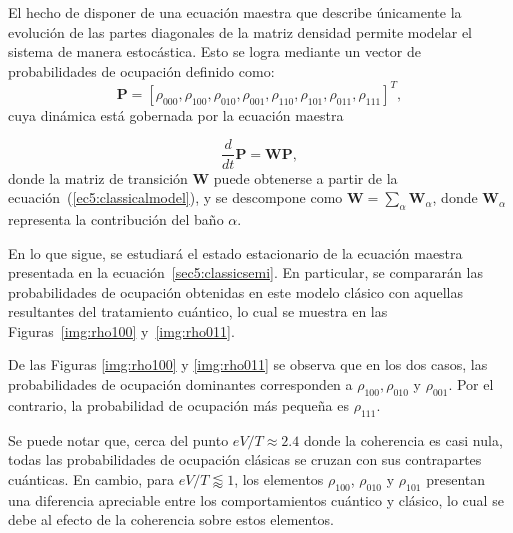 El hecho de disponer de una ecuación maestra que describe únicamente la evolución de las partes diagonales de la matriz densidad permite modelar el sistema de manera estocástica. Esto se logra mediante un vector de probabilidades de ocupación definido como:
\begin{equation*}
\mathbf{P} = [\rho_{000}, \rho_{100}, \rho_{010}, \rho_{001}, \rho_{110}, \rho_{101}, \rho_{011}, \rho_{111}]^{T},
\end{equation*}
cuya dinámica está gobernada por la ecuación maestra

\begin{equation}
    \frac{d}{dt}\textbf{P} = \textbf{W}\textbf{P},
    \label{sec5:classicsemi}
\end{equation}
donde la matriz de transición $\mathbf{W}$ puede obtenerse a partir de la ecuación~(\ref{ec5:classicalmodel}), y se descompone como $\mathbf{W} = \sum_{\alpha} \mathbf{W}_{\alpha}$, donde $\mathbf{W}_{\alpha}$ representa la contribución del baño $\alpha$. 

En lo que sigue, se estudiará el estado estacionario de la ecuación maestra presentada en la ecuación~\ref{sec5:classicsemi}. En particular, se compararán las probabilidades de ocupación obtenidas en este modelo clásico con aquellas resultantes del tratamiento cuántico, lo cual se muestra en las Figuras~\ref{img:rho100} y~\ref{img:rho011}. 


De las Figuras \ref{img:rho100} y \ref{img:rho011} se observa que en los dos casos, las probabilidades de ocupación dominantes corresponden a $\rho_{100},\rho_{010}$ y $\rho_{001}$. Por el contrario, la probabilidad de ocupación más pequeña es $\rho_{111}$.
 
Se puede notar que, cerca del punto $eV/T \approx 2.4$ donde la coherencia es casi nula, todas las probabilidades de ocupación clásicas se cruzan con sus contrapartes cuánticas. En cambio, para $eV/T \lessapprox 1$, los elementos $\rho_{100}$, $\rho_{010}$ y $\rho_{101}$ presentan una diferencia apreciable entre los comportamientos cuántico y clásico, lo cual se debe al efecto de la coherencia sobre estos elementos.


